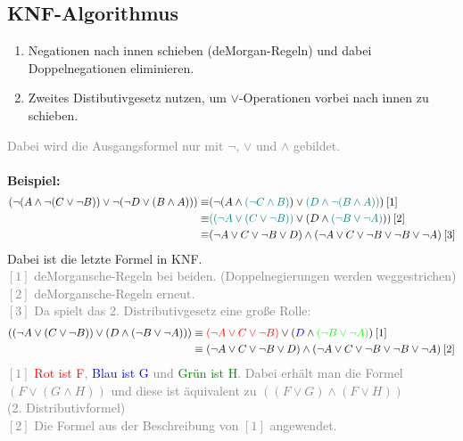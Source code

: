 \documentclass{article}
\begin{document}
\begin{itemize}
		\subsection{KNF-Algorithmus}
		\begin{enumerate}
			\item Negationen nach innen schieben (deMorgan-Regeln) und dabei Doppelnegationen eliminieren.
			\item Zweites Distibutivgesetz nutzen, um $\vee$-Operationen vorbei nach innen zu schieben.
		\end{enumerate}
		\textcolor{gray}{Dabei wird die Ausgangsformel nur mit $\neg$, $\vee$ und $\wedge$ gebildet.} \\
		\\
		\textbf{Beispiel:} \\
		\begin{align*}
			(\neg(A \wedge\neg(C \vee \neg B))\vee \neg(\neg D \vee (B \wedge A))) 
			\equiv& (\neg(A \wedge\textcolor{teal}{(\neg C \wedge B)}) \vee \textcolor{teal}{(D \wedge \neg (B \wedge A))}) \: [1] \\
			\equiv& \textcolor{teal}{((\neg A \vee (C \vee \neg B))} \vee (D \wedge \textcolor{teal}{(\neg B \vee \neg A)})) \: [2] \\
			\equiv& (\neg A \vee C \vee \neg B \vee D) \wedge (\neg A \vee C \vee \neg B \vee \neg B \vee \neg A) \: [3]
		\end{align*}
		Dabei ist die letzte Formel in KNF. \\
		\textcolor{gray}{
			$[1]$ deMorgansche-Regeln bei beiden. (Doppelnegierungen werden weggestrichen)\\
			$[2]$ deMorgansche-Regeln erneut.\\
			$[3]$ Da spielt das 2. Distributivgesetz eine große Rolle:
		}
		\begin{align*}
			((\neg A \vee (C \vee \neg B)) \vee (D \wedge (\neg B \vee \neg A))) &\equiv \textcolor{red}{(\neg A \vee C \vee \neg B)} \vee (\textcolor{blue}{D} \wedge \textcolor{green}{(\neg B \vee \neg A)}) \: [1] \\
			&\equiv (\neg A \vee C \vee \neg B \vee D) \wedge (\neg A \vee C \vee \neg B \vee \neg B \vee \neg A) \: [2]
		\end{align*}
		\textcolor{gray}{
			$[1]$ \textcolor{red}{Rot ist F}, \textcolor{blue}{Blau ist G} und \textcolor{green}{Grün ist H}. Dabei erhält man die Formel $(F \vee (G \wedge H))$ und diese ist äquivalent zu $((F \vee G) \wedge (F \vee H))$\\ (2. Distributivformel)\\
			$[2]$ Die Formel aus der Beschreibung von $[1]$ angewendet.\\
		}

\end{itemize}
\end{document}
